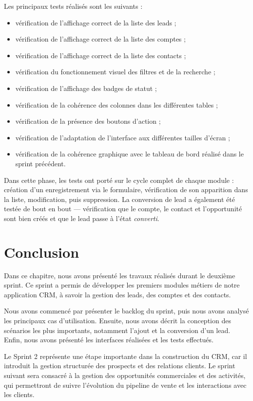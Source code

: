 \documentclass[12pt,a4paper,twoside,openany]{book}
\begin{document}
Les principaux tests réalisés sont les suivants :

\begin{itemize}
    \item vérification de l’affichage correct de la liste des leads ;
    \item vérification de l’affichage correct de la liste des comptes ;
    \item vérification de l’affichage correct de la liste des contacts ;
    \item vérification du fonctionnement visuel des filtres et de la recherche ;
    \item vérification de l’affichage des badges de statut ;
    \item vérification de la cohérence des colonnes dans les différentes tables ;
    \item vérification de la présence des boutons d’action ;
    \item vérification de l’adaptation de l’interface aux différentes tailles d’écran ;
    \item vérification de la cohérence graphique avec le tableau de bord réalisé dans le sprint précédent.
\end{itemize}

Dans cette phase, les tests ont porté sur le cycle complet de chaque module : création d’un enregistrement via le formulaire, vérification de son apparition dans la liste, modification, puis suppression. La conversion de lead a également été testée de bout en bout — vérification que le compte, le contact et l’opportunité sont bien créés et que le lead passe à l’état \textit{converti}.

\section*{Conclusion}

Dans ce chapitre, nous avons présenté les travaux réalisés durant le deuxième sprint. Ce sprint a permis de développer les premiers modules métiers de notre application CRM, à savoir la gestion des leads, des comptes et des contacts.

Nous avons commencé par présenter le backlog du sprint, puis nous avons analysé les principaux cas d’utilisation. Ensuite, nous avons décrit la conception des scénarios les plus importants, notamment l’ajout et la conversion d’un lead. Enfin, nous avons présenté les interfaces réalisées et les tests effectués.

Le Sprint 2 représente une étape importante dans la construction du CRM, car il introduit la gestion structurée des prospects et des relations clients. Le sprint suivant sera consacré à la gestion des opportunités commerciales et des activités, qui permettront de suivre l’évolution du pipeline de vente et les interactions avec les clients.
\end{document}
